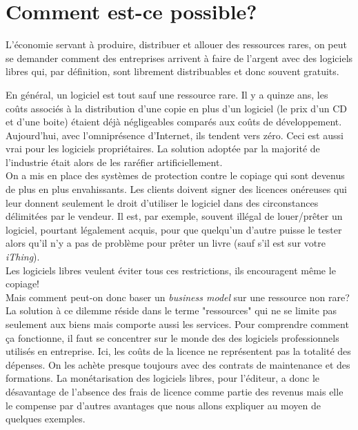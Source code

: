 





\section*{Comment est-ce possible?}
L'économie servant à produire, distribuer et allouer des ressources rares,
on peut se demander comment des entreprises arrivent à faire de l'argent avec des logiciels libres qui, par définition, sont librement distribuables et donc souvent gratuits.

En général, un logiciel est tout sauf une ressource rare. Il y a quinze ans, les coûts
associés à la distribution d'une copie en plus d'un logiciel (le prix d'un CD et d'une boite) étaient déjà négligeables
comparés aux coûts de développement. Aujourd’hui, avec l'omniprésence d'Internet, ils tendent vers zéro.
Ceci est aussi vrai pour les logiciels propriétaires. La solution adoptée par
la majorité de l'industrie était alors de les raréfier artificiellement.\\
On a mis en place des systèmes de protection contre le copiage qui sont devenus 
de plus en plus envahissants. Les clients doivent signer des licences onéreuses qui
leur donnent seulement le droit d'utiliser le logiciel dans des circonstances délimitées par le vendeur.
Il est, par exemple, souvent illégal de louer/prêter un logiciel, pourtant légalement acquis,
pour que quelqu'un d'autre puisse le tester alors qu'il n'y a pas de problème pour prêter un livre (sauf s'il est sur votre \textit{iThing}).\\
Les logiciels libres veulent éviter tous ces restrictions, ils encouragent même le copiage!\\

Mais comment peut-on donc baser un \textit{business model} sur une ressource non rare?                           
La solution à ce dilemme réside dans le terme "ressources" qui
ne se limite pas seulement aux biens mais comporte aussi les services.
Pour comprendre comment ça fonctionne, il faut se concentrer sur le monde des 
des logiciels professionnels utilisés en entreprise. Ici, les coûts de la licence
ne représentent pas la totalité des dépenses. On les achète presque toujours avec
des contrats de maintenance et des formations.
La monétarisation des logiciels libres, pour l'éditeur, a donc le désavantage de l'absence des frais de licence
comme partie des revenus mais elle le compense par d'autres avantages que nous allons 
expliquer au moyen de quelques exemples.

